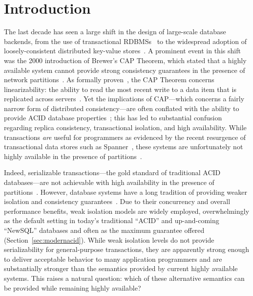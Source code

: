 
\section{Introduction}

The last decade has seen a large shift in the design of large-scale
database backends, from the use of transactional
RDBMSs~\cite{bernstein-book, gray-isolation, gray-virtues} to the
widespread adoption of loosely-consistent distributed key-value
stores~\cite{bigtable, pnuts, dynamo}. A prominent event in this shift
was the 2000 introduction of Brewer's CAP Theorem, which stated that a
highly available system cannot provide strong consistency guarantees
in the presence of network partitions~\cite{brewer-slides}. As
formally proven~\cite{gilbert-cap}, the CAP Theorem concerns
linearizability: the ability to read the most recent write to a data
item that is replicated across servers~\cite{herlihy-art}. Yet the
implications of CAP---which concerns a fairly narrow form of
distributed consistency---are often conflated with the ability to
provide ACID database properties~\cite{brewer-slides, hn,
  foundation-article}; this has led to substantial confusion regarding
replica consistency, transactional isolation, and high
availability. While transactions \textit{are} useful for programmers
as evidenced by the recent resurgence of transactional data stores
such as Spanner~\cite{spanner}, these systems are unfortunately not
highly available in the presence of partitions~\cite{middleware-db,
  foundation-article, hstore,generalizedsnapshot, mdcc,
  krikellas-bargain, eiger, walter, calvin}.

Indeed, serializable transactions---the gold standard of traditional
ACID databases---are not achievable with high availability in the
presence of partitions~\cite{davidson-survey}. However, database
systems have a long tradition of providing weaker isolation and
consistency guarantees~\cite{adya, ansicritique, gray-virtues,
  gray-isolation, kemme-thesis}. Due to their concurrency and overall
performance benefits, weak isolation models are widely employed,
overwhelmingly as the default setting in today's traditional ``ACID''
and up-and-coming ``NewSQL'' databases and often as the maximum
guarantee offered (Section~\ref{sec:modernacid}). While weak isolation
levels do not provide serializability for general-purpose
transactions, they are apparently strong enough to deliver acceptable
behavior to many application programmers and are substantially
stronger than the semantics provided by current highly available
systems. This raises a natural question: which of these alternative
semantics can be provided while remaining highly available?

